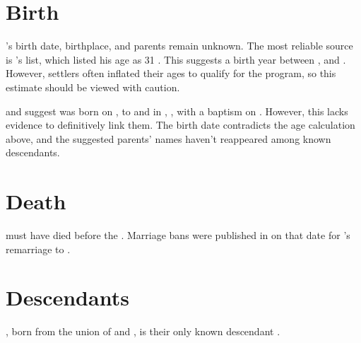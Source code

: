 \section[Birth]{Birth}
\label{sec: Birth}

\mcdonaldJNameOnly{}'s birth date, birthplace, and parents remain unknown. The most reliable source is \biggarASurname{}'s \settler{} list, which listed his age as 31 \autocite[536-539]{eggsa:biggarCorrespondance}. This suggests a birth year between , and . However, settlers often inflated their ages to qualify for the program, so this estimate should be viewed with caution.

\citeauthor{FS:JamesMcDonaldBaptism} and \citeauthor{settlers:JamesMcDonald} suggest \mcdonaldJName{} was born on , to \mcdonaldWWFullNames{} and \aitchisonJFullNames{} in \crawfordFull{}, \scotland{}, with a baptism on  \autocite{FS:JamesMcDonaldBaptism} \autocite{settlers:JamesMcDonald}. However, this lacks evidence to definitively link them. The birth date contradicts the age calculation above, and the suggested parents' names haven't reappeared among known descendants.

\section[Death]{Death}
\label{sec: Death}

\mcdonaldJNameOnly{} must have died before the . Marriage bans were published in \grahamstown{} on that date for \welchMName{}'s remarriage to \henmanRName{} \autocite{settlers:JamesMcDonald} \autocite{settlers:MaryWelch}.

\section[Descendants]{Descendants}
\label{sec: Descendants}

\mcdonaldAName{}, born from the union of \mcdonaldJName{} and \welchMName{}, is their only known descendant \autocite[46]{nash:1820}.